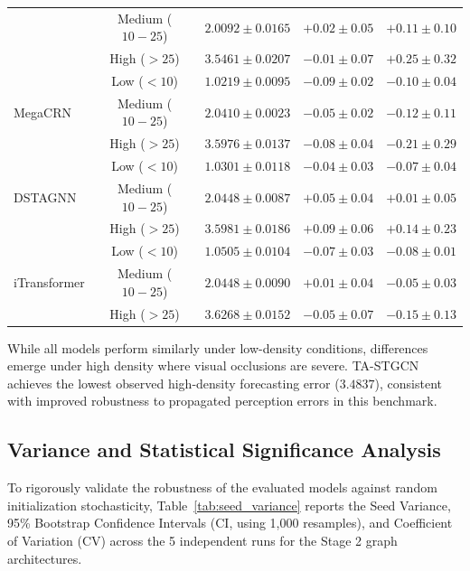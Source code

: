 \documentclass[a4paper,fleqn]{cas-sc}
\begin{document}
\begin{table}[pos=htbp]
\begin{tabular}{lcccc}
 & Medium ($10-25$) & $2.0092 \pm 0.0165$ & $+0.02 \pm 0.05$ & $+0.11 \pm 0.10$ \\
 & High ($>25$) & $3.5461 \pm 0.0207$ & $-0.01 \pm 0.07$ & $+0.25 \pm 0.32$ \\
\midrule
\multirow{3}{*}{MegaCRN} & Low ($<10$) & $1.0219 \pm 0.0095$ & $-0.09 \pm 0.02$ & $-0.10 \pm 0.04$ \\
 & Medium ($10-25$) & $2.0410 \pm 0.0023$ & $-0.05 \pm 0.02$ & $-0.12 \pm 0.11$ \\
 & High ($>25$) & $3.5976 \pm 0.0137$ & $-0.08 \pm 0.04$ & $-0.21 \pm 0.29$ \\
\midrule
\multirow{3}{*}{DSTAGNN} & Low ($<10$) & $1.0301 \pm 0.0118$ & $-0.04 \pm 0.03$ & $-0.07 \pm 0.04$ \\
 & Medium ($10-25$) & $2.0448 \pm 0.0087$ & $+0.05 \pm 0.04$ & $+0.01 \pm 0.05$ \\
 & High ($>25$) & $3.5981 \pm 0.0186$ & $+0.09 \pm 0.06$ & $+0.14 \pm 0.23$ \\
\midrule
\multirow{3}{*}{iTransformer} & Low ($<10$) & $1.0505 \pm 0.0104$ & $-0.07 \pm 0.03$ & $-0.08 \pm 0.01$ \\
 & Medium ($10-25$) & $2.0448 \pm 0.0090$ & $+0.01 \pm 0.04$ & $-0.05 \pm 0.03$ \\
 & High ($>25$) & $3.6268 \pm 0.0152$ & $-0.05 \pm 0.07$ & $-0.15 \pm 0.13$ \\
\bottomrule
\end{tabular}%
\end{table}

While all models perform similarly under low-density conditions, differences emerge under high density where visual occlusions are severe. TA-STGCN achieves the lowest observed high-density forecasting error ($3.4837$), consistent with improved robustness to propagated perception errors in this benchmark.

\subsection{Variance and Statistical Significance Analysis}
\label{sec:variance_analysis}

To rigorously validate the robustness of the evaluated models against random initialization stochasticity, Table~\ref{tab:seed_variance} reports the Seed Variance, 95\% Bootstrap Confidence Intervals (CI, using 1,000 resamples), and Coefficient of Variation (CV) across the 5 independent runs for the Stage 2 graph architectures.
\end{document}
